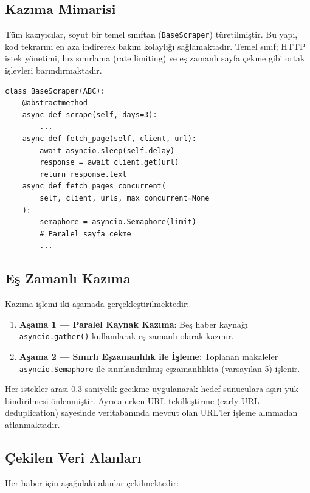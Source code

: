 \documentclass[conference]{IEEEtran}
\begin{document}
\subsection{Kazıma Mimarisi}

Tüm kazıyıcılar, soyut bir temel sınıftan (\texttt{BaseScraper}) türetilmiştir. Bu yapı, kod tekrarını en aza indirerek bakım kolaylığı sağlamaktadır. Temel sınıf; HTTP istek yönetimi, hız sınırlama (rate limiting) ve eş zamanlı sayfa çekme gibi ortak işlevleri barındırmaktadır.

\begin{lstlisting}[caption={Temel kazıyıcı sınıfı yapısı (kısaltılmış)}, label={lst:base}]
class BaseScraper(ABC):
    @abstractmethod
    async def scrape(self, days=3):
        ...
    async def fetch_page(self, client, url):
        await asyncio.sleep(self.delay)
        response = await client.get(url)
        return response.text
    async def fetch_pages_concurrent(
        self, client, urls, max_concurrent=None
    ):
        semaphore = asyncio.Semaphore(limit)
        # Paralel sayfa cekme
        ...
\end{lstlisting}

\subsection{Eş Zamanlı Kazıma}

Kazıma işlemi iki aşamada gerçekleştirilmektedir:

\begin{enumerate}
    \item \textbf{Aşama 1 — Paralel Kaynak Kazıma}: Beş haber kaynağı \texttt{asyncio.gather()} kullanılarak eş zamanlı olarak kazınır.
    \item \textbf{Aşama 2 — Sınırlı Eşzamanlılık ile İşleme}: Toplanan makaleler \texttt{asyncio.Semaphore} ile sınırlandırılmış eşzamanlılıkta (varsayılan 5) işlenir.
\end{enumerate}

Her istekler arası 0.3 saniyelik gecikme uygulanarak hedef sunuculara aşırı yük bindirilmesi önlenmiştir. Ayrıca erken URL tekilleştirme (early URL deduplication) sayesinde veritabanında mevcut olan URL'ler işleme alınmadan atlanmaktadır.

\subsection{Çekilen Veri Alanları}

Her haber için aşağıdaki alanlar çekilmektedir:
\end{document}
